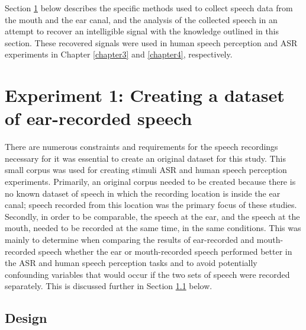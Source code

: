 Section \ref{expt1} below describes the specific methods used to collect speech data from the mouth and the ear canal, and the analysis of the collected speech in an attempt to recover an intelligible signal with the knowledge outlined in this section.  These recovered signals were used in human speech perception and ASR experiments in Chapter \ref{chapter3} and \ref{chapter4}, respectively.


\section{Experiment 1: Creating a dataset of ear-recorded speech}\label{expt1}

There are numerous constraints and requirements for the speech recordings necessary for \DIFdelbegin {}\DIFdelend \DIFaddbegin {}\DIFaddend it was essential to create an original dataset for this study.  This small corpus was used for creating stimuli ASR and human speech perception experiments.  Primarily, an original corpus needed to be created because there is no known dataset of speech in which the recording location is inside the ear canal; speech recorded from this location was the primary focus of these studies.  Secondly, in order to be comparable, the speech at the ear, and the speech at the mouth, needed to be recorded at the same time, in the same conditions.  This was mainly to determine \DIFdelbegin \DIFdel{, }\DIFdelend \DIFaddbegin \DIFadd{- }\DIFaddend when comparing the results of ear-recorded and mouth-recorded speech \DIFdelbegin \DIFdel{, }\DIFdelend \DIFaddbegin \DIFadd{- }\DIFaddend whether the ear or mouth-recorded speech performed better in the ASR and human speech perception tasks and to avoid potentially confounding variables that would occur if the two sets of speech were recorded separately. This is discussed further in Section \ref{chap2:methods:design} below.

\subsection{Design}
\label{chap2:methods:design}

